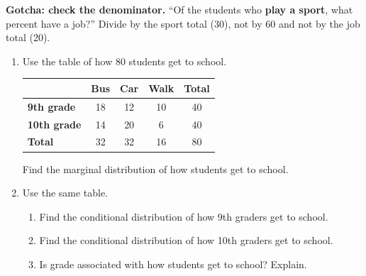 \documentclass[11pt]{article}
\begin{document}
\vspace{0.8em}
\textbf{Gotcha: check the denominator.} ``Of the students who \textbf{play a sport}, what percent have a job?'' Divide by the sport total (30), not by 60 and not by the job total (20).

\partner

\newpage
\begin{enumerate}

\item Use the table of how 80 students get to school.

\begin{center}
\renewcommand{\arraystretch}{1.4}
\begin{tabular}{|l|c|c|c|c|}\hline
 & \textbf{Bus} & \textbf{Car} & \textbf{Walk} & \textbf{Total} \\ \hline
\textbf{9th grade} & 18 & 12 & 10 & 40 \\ \hline
\textbf{10th grade} & 14 & 20 & 6 & 40 \\ \hline
\textbf{Total} & 32 & 32 & 16 & 80 \\ \hline
\end{tabular}
\end{center}

Find the marginal distribution of how students get to school.

\work{4em}

\item Use the same table.
\begin{enumerate}[itemsep=1em]
  \item Find the conditional distribution of how 9th graders get to school.

  \work{3em}
  \item Find the conditional distribution of how 10th graders get to school.

  \work{3em}
  \item Is grade associated with how students get to school? Explain.

\end{enumerate}
\work{2em}


\end{enumerate}
\end{document}
